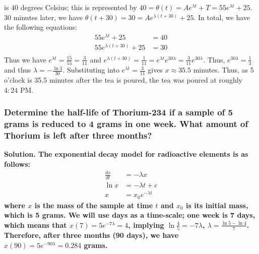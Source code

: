 \documentclass{article}
\begin{document}
is $40$ degrees Celsius; this is represented by $40 = \theta(t) = Ae^{\lambda t} + T = 55e^{\lambda t} + 25$. 30 minutes later, we have $\theta(t+30) = 30 = Ae^{\lambda(t+30)} + 25$. In total, we have the following equations:
\begin{equation*}
    \begin{aligned}
        55e^{\lambda t} + 25 &= 40 \\
        55e^{\lambda(t+30)} + 25 &= 30 \\
    \end{aligned}
\end{equation*}
Thus we have $e^{\lambda t} = \frac{15}{55} = \frac{3}{11}$ and $e^{\lambda(t + 30)} = \frac{1}{11} = e^{\lambda t} e^{30\lambda} = \frac{3}{11}e^{30 \lambda}$. Thus, $e^{30\lambda} = \frac{1}{3}$ and thus $\lambda = -\frac{\ln 3}{30}$. Substituting into $e^{\lambda t} = \frac{3}{11}$ gives $x \approx 35.5$ minutes. Thus, as 5 o'clock is 35.5 minutes after the tea is poured, the tea was poured at roughly $4:24$ PM.

\hrulefill
\subsubsection*{Determine the half-life of Thorium-234 if a sample of 5 grams is reduced to 4 grams in one week. What amount of Thorium is left after three months?}
\bf Solution. \normalfont The exponential decay model for radioactive elements is as follows:
\begin{equation*}
    \begin{aligned}
        \frac{dx}{dt} &= -\lambda x \\
        \ln x &= -\lambda t + c \\
        x &= x_0e^{-\lambda t}
    \end{aligned}
\end{equation*}
where $x$ is the mass of the sample at time $t$ and $x_0$ is its initial mass, which is 5 grams. We will use days as a time-scale; one week is 7 days, which means that $x(7) = 5e^{-7\lambda } = 4$, implying $\ln \frac{4}{5} = -7 \lambda$, $\lambda = \frac{\ln 5 - \ln 4}{7}$.
 Therefore, after three months (90 days), we have $x(90) = 5e^{-90\lambda} = 0.284$ grams.

\hrulefill
\end{document}
